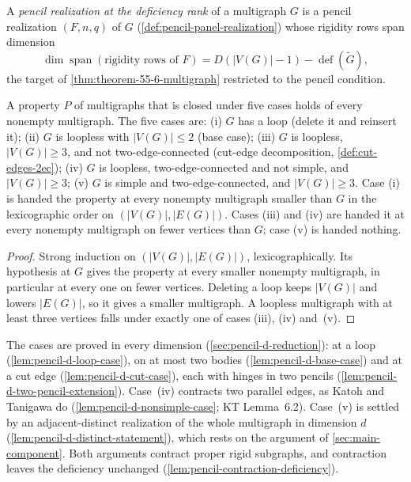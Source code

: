 \begin{definition}
  \label{def:pencil-rank-hypothesis}
  \leanok
  A \emph{pencil realization at the deficiency rank} of a multigraph $G$ is
  a pencil realization $(F, n, q)$ of $G$
  (\cref{def:pencil-panel-realization}) whose rigidity rows span dimension
  \[
    \dim \operatorname{span}(\text{rigidity rows of } F)
      = D(|V(G)| - 1) - \operatorname{def}(\tilde G),
  \]
  the target of \cref{thm:theorem-55-6-multigraph} restricted to the pencil
  condition.
\end{definition}

\begin{theorem}
  \label{thm:pencil-reduction}
  \leanok
  A property $P$ of multigraphs that is closed under five cases holds of
  every nonempty multigraph. The five cases are: \textup{(i)} $G$ has a
  loop (delete it and reinsert it); \textup{(ii)} $G$ is loopless with
  $|V(G)| \le 2$ (base case); \textup{(iii)} $G$ is loopless, $|V(G)| \ge
  3$, and not two-edge-connected (cut-edge decomposition,
  \cref{def:cut-edges-2ec}); \textup{(iv)} $G$ is loopless,
  two-edge-connected and not simple, and $|V(G)| \ge 3$; \textup{(v)}
  $G$ is simple and two-edge-connected, and $|V(G)| \ge 3$. Case (i) is
  handed the property at every nonempty multigraph smaller than $G$ in
  the lexicographic order on $(|V(G)|, |E(G)|)$. Cases (iii) and (iv)
  are handed it at every nonempty multigraph on fewer vertices than $G$;
  case (v) is handed nothing.
\end{theorem}
\begin{proof}
  \leanok
  Strong induction on $(|V(G)|, |E(G)|)$, lexicographically. Its
  hypothesis at $G$ gives the property at every smaller nonempty
  multigraph, in particular at every one on fewer vertices. Deleting a
  loop keeps $|V(G)|$ and lowers $|E(G)|$, so it gives a smaller
  multigraph. A loopless multigraph with at least three vertices falls
  under exactly one of cases (iii), (iv) and~(v).
\end{proof}

The cases are proved in every dimension (\cref{sec:pencil-d-reduction}):
at a loop (\cref{lem:pencil-d-loop-case}), on at most two bodies
(\cref{lem:pencil-d-base-case}) and at a cut edge
(\cref{lem:pencil-d-cut-case}), each with hinges in two pencils
(\cref{lem:pencil-d-two-pencil-extension}). Case~(iv) contracts two
parallel edges, as Katoh and Tanigawa do
(\cref{lem:pencil-d-nonsimple-case}; KT Lemma~6.2). Case~(v) is settled
by an adjacent-distinct realization of the whole multigraph in dimension
$d$ (\cref{lem:pencil-d-distinct-statement}), which rests on the argument
of \cref{sec:main-component}. Both arguments contract proper rigid
subgraphs, and contraction leaves the deficiency unchanged
(\cref{lem:pencil-contraction-deficiency}).

